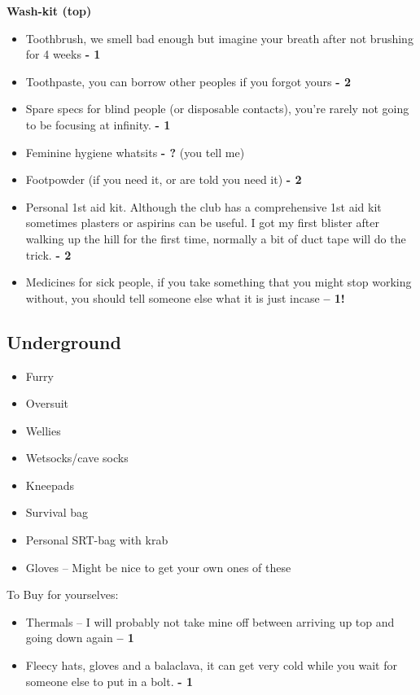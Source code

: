 \textbf{Wash-kit (top)}
\begin{itemize}
    \item Toothbrush, we smell bad enough but imagine your breath after not brushing for 4 weeks \textbf{- 1}
    \item Toothpaste, you can borrow other peoples if you forgot yours \textbf{- 2}
    \item Spare specs for blind people (or disposable contacts), you’re rarely not going to be focusing at infinity. \textbf{- 1}
    \item Feminine hygiene whatsits \textbf{- ?} (you tell me)
    \item Footpowder (if you need it, or are told you need it) \textbf{- 2}
    \item Personal 1st aid kit. Although the club has a comprehensive 1st aid kit sometimes plasters or aspirins can be useful. I got my first blister after walking up the hill for the first time, normally a bit of duct tape will do the trick. \textbf{- 2}
    \item Medicines for sick people, if you take something that you might stop working without, you should tell someone else what it is just incase \textbf{– 1!}
\end{itemize}

\subsection{Underground}
\begin{itemize}
    \item Furry
    \item Oversuit
    \item Wellies
    \item Wetsocks/cave socks
    \item Kneepads
    \item Survival bag
    \item Personal SRT-bag with krab
    \item Gloves – Might be nice to get your own ones of these
\end{itemize}

To Buy for yourselves:
\begin{itemize}
    \item Thermals – I will probably not take mine off between arriving up top and going down again \textbf{– 1}
    \item Fleecy hats, gloves and a balaclava, it can get very cold while you wait for someone else to put in a bolt. \textbf{- 1}
\end{itemize}

